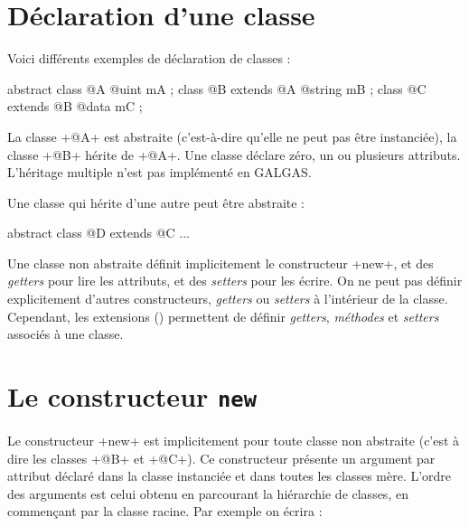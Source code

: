 

\section{Déclaration d'une classe}

Voici différents exemples de déclaration de classes :

\begin{galgas}
abstract class @A {
  @uint mA ;
}
class @B extends @A {
  @string mB ;
}
class @C extends @B {
  @data mC ;
}
\end{galgas}

La classe \ggs+@A+ est abstraite (c'est-à-dire qu'elle ne peut pas être instanciée), la classe \ggs+@B+ hérite de \ggs+@A+. Une classe déclare zéro, un ou plusieurs attributs. L'héritage multiple n'est pas implémenté en GALGAS.

Une classe qui hérite d'une autre peut être abstraite :
\begin{galgas}
abstract class @D extends @C {
  ...
 }
\end{galgas}

Une classe non abstraite définit implicitement le constructeur \ggs+new+, et des \emph{getters} pour lire les attributs, et des \emph{setters} pour les écrire. On ne peut pas définir explicitement d'autres constructeurs, \emph{getters} ou \emph{setters} à l'intérieur de la classe. Cependant,  les extensions () permettent de définir \emph{getters}, \emph{méthodes} et \emph{setters} associés à une classe.












\section{Le constructeur \texttt{new}}

Le constructeur \ggs+new+ est implicitement pour toute classe non abstraite (c'est à dire les classes \ggs+@B+ et \ggs+@C+). Ce constructeur présente un argument par attribut déclaré dans la classe instanciée et dans toutes les classes mère. L'ordre des arguments est celui obtenu en parcourant la hiérarchie de classes, en commençant par la classe racine. Par exemple on écrira :

